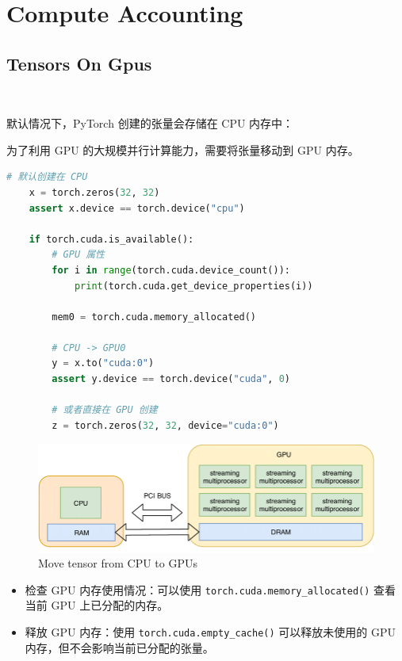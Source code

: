 \clearpage
{\chaptoc\noindent\begin{minipage}[inner sep=0,outer sep=0]{0.9\linewidth}\section{Compute Accounting}\end{minipage}}

\subsection{Tensors On Gpus}~{}

默认情况下，PyTorch 创建的张量会存储在 CPU 内存中：

为了利用 GPU 的大规模并行计算能力，需要将张量移动到 GPU 内存。

\begin{lstlisting}[language=Python]
    # 默认创建在 CPU
    x = torch.zeros(32, 32)
    assert x.device == torch.device("cpu")

    if torch.cuda.is_available():
        # GPU 属性
        for i in range(torch.cuda.device_count()):
            print(torch.cuda.get_device_properties(i))

        mem0 = torch.cuda.memory_allocated()

        # CPU -> GPU0
        y = x.to("cuda:0")
        assert y.device == torch.device("cuda", 0)

        # 或者直接在 GPU 创建
        z = torch.zeros(32, 32, device="cuda:0")
\end{lstlisting}

\begin{figure}[htbp]
  \centering
  \includegraphics[width=0.9\linewidth]{figs/lec2/lec2.40.png}
  \caption{Move tensor from CPU to GPUs}
\end{figure}

\par

\begin{itemize}
    \item 检查 GPU 内存使用情况：可以使用 \texttt{torch.cuda.memory\_allocated()} 查看当前 GPU 上已分配的内存。
    \item 释放 GPU 内存：使用 \texttt{torch.cuda.empty\_cache()} 可以释放未使用的 GPU 内存，但不会影响当前已分配的张量。
\end{itemize}



